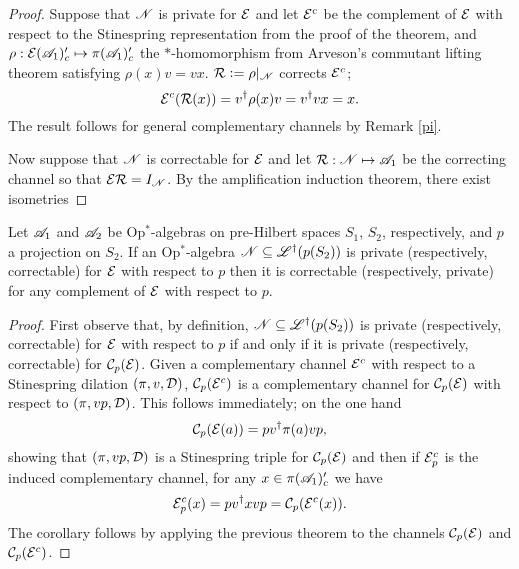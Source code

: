 \documentclass[12pt]{article}
\begin{document}
\begin{proof}
	
	Suppose that $\mathscr{N}$ is private for $\mathcal{E}$ and let $\mathcal{E}^c$ be the complement of $\mathcal{E}$ with respect to the Stinespring representation from the proof of the theorem,
	and $\rho: \mathcal{E}(\mathscr{A}_1)'_c \mapsto \pi(\mathscr{A}_1)'_c$ the $*$-homomorphism from Arveson's commutant lifting theorem satisfying $\rho(x)v = vx$. 
	$\mathcal{R} \vcentcolon= \rho|_\mathscr{N}$ corrects $\mathcal{E}^c$; $$\mathcal{E}^c(\mathcal{R}(x)) = v^\dagger\rho(x)v = v^\dagger vx = x.$$ 
	The result follows for general complementary channels by Remark \ref{pi}.

	Now suppose that $\mathscr{N}$ is correctable for $\mathcal{E}$ and let $\mathcal{R}:\mathscr{N} \mapsto \mathscr{A}_1$ be the correcting channel so that $\mathcal{E}\mathcal{R} = I_\mathscr{N}$. 
	By the amplification induction theorem, there exist isometries
	

\end{proof}

\begin{corollary}
	
	Let $\mathscr{A}_1$ and $\mathscr{A}_2$ be Op$^*$-algebras on pre-Hilbert spaces $S_1$, $S_2$, respectively, and $p$ a projection on $S_2$.
	If an Op$^*$-algebra $\mathscr{N} \subseteq \mathscr{L}^\dagger(p(S_2))$ is private (respectively, correctable) for $\mathcal{E}$ with respect to $p$ then it is
	correctable (respectively, private) for any complement of $\mathcal{E}$ with respect to $p$.

\end{corollary}

\begin{proof}
	First observe that, by definition, $\mathscr{N} \subseteq \mathscr{L}^\dagger(p(S_2))$ is private (respectively, correctable) for $\mathcal{E}$ with respect to $p$
	if and only if it is private (respectively, correctable) for $\mathcal{C}_p(\mathcal{E})$. 
	Given a complementary channel $\mathcal{E}^c$ with respect to a Stinespring dilation $(\pi, v, \mathcal{D})$, $\mathcal{C}_p(\mathcal{E}^c)$ is a complementary channel
	for $\mathcal{C}_p(\mathcal{E})$ with respect to $(\pi, vp, \mathcal{D})$. 
	This follows immediately; on the one hand $$\mathcal{C}_p(\mathcal{E}(a)) = pv^\dagger\pi(a)vp,$$ showing that $(\pi, vp, \mathcal{D})$ is a Stinespring triple for 
	$\mathcal{C}_p(\mathcal{E})$ and then if $\mathcal{E}^c_p$ is the induced complementary channel, for any $x \in \pi(\mathscr{A}_1)'_c$ we have
	$$\mathcal{E}^c_p(x) = pv^\dagger xvp = \mathcal{C}_p(\mathcal{E}^c(x)).$$
	The corollary follows by applying the previous theorem to the channels $\mathcal{C}_p(\mathcal{E})$ and $\mathcal{C}_p(\mathcal{E}^c)$.
	

\end{proof}
\end{document}

